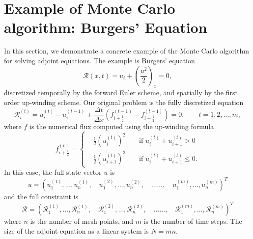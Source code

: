 \documentclass{elsart}
\theoremstyle{remark}
\theoremstyle{definition}
\theoremstyle{proof}
\begin{document}
\section{Example of Monte Carlo algorithm: Burgers' Equation}
    In this section, we demonstrate a concrete example of the Monte Carlo
    algorithm for solving adjoint equations.  The example is Burgers' equation
    \[ \mathcal{R}(x,t) = u_t + \left( \frac{u^2}{2} \right)_x = 0 , \]
    discretized temporally by the forward Euler scheme, and spatially by the
    first order up-winding scheme.  Our original problem is the fully
    discretized equation
    \begin{equation} \label{expG}
        \mathcal{R}_i^{(t)} = u_i^{(t)} - u_i^{(t-1)}
        + \frac{\Delta t}{\Delta x}\left( f_{i+\frac12}^{(t-1)}
        - f_{i-\frac12}^{(t-1)} \right) = 0,
        \qquad t = 1,2,\ldots,m,
    \end{equation}
    where $f$ is the numerical flux computed using the up-winding formula
    \[ f_{i+\frac12}^{(t)} =
        \left\{ \begin{aligned}
            & \frac12 \left( u_i^{(t)} \right)^2 &&
                \mbox{ if } u_i^{(t)} + u_{i+1}^{(t)} > 0 \\
            & \frac12 \left( u_{i+1}^{(t)} \right)^2 &&
                \mbox{ if } u_i^{(t)} + u_{i+1}^{(t)} \le 0.
    \end{aligned} \right. \]
    In this case, the full state vector $u$ is
    \[ u = \left( u_1^{(1)}, \ldots, u_n^{(1)},\quad u_1^{(2)}, \ldots,
           u_n^{(2)}, \quad \ldots\ldots,\quad
           u_1^{(m)}, \ldots, u_n^{(m)} \right)^T
    \]
    and the full constraint is
    \[ \mathcal{R} = \left( \mathcal{R}_1^{(1)}, \ldots, 
                            \mathcal{R}_n^{(1)}, \quad
                            \mathcal{R}_1^{(2)}, \ldots,
                            \mathcal{R}_n^{(2)}, \quad \ldots\ldots,\quad
                            \mathcal{R}_1^{(m)}, \ldots,
                            \mathcal{R}_n^{(m)} \right)^T
    \]
    where $n$ is the number of mesh points, and $m$ is the number of
    time steps.  The size of the adjoint equation as a linear system is
    $N = m n$.
    
\end{document}
